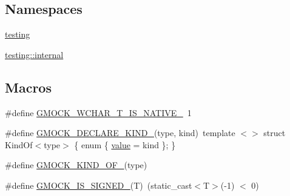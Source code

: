 \subsection*{Namespaces}
\begin{DoxyCompactItemize}
\item 
 \mbox{\hyperlink{namespacetesting}{testing}}
\item 
 \mbox{\hyperlink{namespacetesting_1_1internal}{testing\+::internal}}
\end{DoxyCompactItemize}
\subsection*{Macros}
\begin{DoxyCompactItemize}
\item 
\#define \mbox{\hyperlink{googletest-master_2googlemock_2include_2gmock_2internal_2gmock-internal-utils_8h_a0725bd2b3326d282677e5197e53cc5e9}{G\+M\+O\+C\+K\+\_\+\+W\+C\+H\+A\+R\+\_\+\+T\+\_\+\+I\+S\+\_\+\+N\+A\+T\+I\+V\+E\+\_\+}}~1
\item 
\#define \mbox{\hyperlink{googletest-master_2googlemock_2include_2gmock_2internal_2gmock-internal-utils_8h_a7d8a1871d7a30543a4e1882a8b2bbcd8}{G\+M\+O\+C\+K\+\_\+\+D\+E\+C\+L\+A\+R\+E\+\_\+\+K\+I\+N\+D\+\_\+}}(type,  kind)~template $<$$>$ struct Kind\+Of$<$type$>$ \{ enum \{ \mbox{\hyperlink{_obj__test_2lib_2googletest-master_2googlemock_2test_2gmock-matchers__test_8cc_a337b8a670efc0b086ad3af163f3121b6}{value}} = kind \}; \}
\item 
\#define \mbox{\hyperlink{googletest-master_2googlemock_2include_2gmock_2internal_2gmock-internal-utils_8h_a72b01bdd08b78e927270885ca880ead4}{G\+M\+O\+C\+K\+\_\+\+K\+I\+N\+D\+\_\+\+O\+F\+\_\+}}(type)
\item 
\#define \mbox{\hyperlink{googletest-master_2googlemock_2include_2gmock_2internal_2gmock-internal-utils_8h_a8ee49a1af821b48fd83849c050d0d5a2}{G\+M\+O\+C\+K\+\_\+\+I\+S\+\_\+\+S\+I\+G\+N\+E\+D\+\_\+}}(T)~(static\+\_\+cast$<$T$>$(-\/1) $<$ 0)
\end{DoxyCompactItemize}
